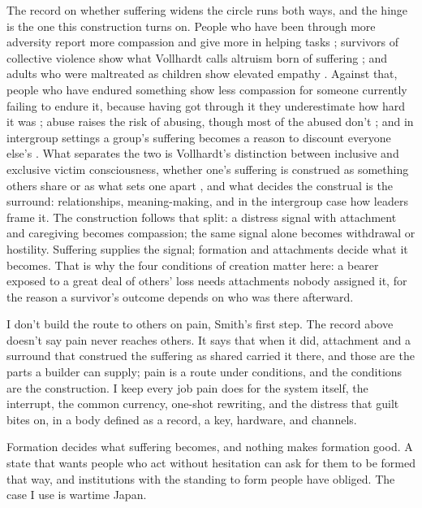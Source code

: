 The record on whether suffering widens the circle runs both ways, and the hinge is the one this construction turns on. People who have been through more adversity report more compassion and give more in helping tasks \autocite{lim2016suffering}; survivors of collective violence show what Vollhardt calls altruism born of suffering \autocite{vollhardt2009altruism}; and adults who were maltreated as children show elevated empathy \autocite{greenberg2018elevated}. Against that, people who have endured something show less compassion for someone currently failing to endure it, because having got through it they underestimate how hard it was \autocite{ruttan2015been}; abuse raises the risk of abusing, though most of the abused don't \autocite{widom1989cycle}; and in intergroup settings a group's suffering becomes a reason to discount everyone else's \autocite{noor2012competitive}. What separates the two is Vollhardt's distinction between inclusive and exclusive victim consciousness, whether one's suffering is construed as something others share or as what sets one apart \autocite{vollhardt2015inclusive}, and what decides the construal is the surround: relationships, meaning-making, and in the intergroup case how leaders frame it. The construction follows that split: a distress signal with attachment and caregiving becomes compassion; the same signal alone becomes withdrawal or hostility. Suffering supplies the signal; formation and attachments decide what it becomes. That is why the four conditions of creation matter here: a bearer exposed to a great deal of others' loss needs attachments nobody assigned it, for the reason a survivor's outcome depends on who was there afterward.

I don't build the route to others on pain, Smith's first step. The record above doesn't say pain never reaches others. It says that when it did, attachment and a surround that construed the suffering as shared carried it there, and those are the parts a builder can supply; pain is a route under conditions, and the conditions are the construction. I keep every job pain does for the system itself, the interrupt, the common currency, one-shot rewriting, and the distress that guilt bites on, in a body defined as a record, a key, hardware, and channels.


Formation decides what suffering becomes, and nothing makes formation good. A state that wants people who act without hesitation can ask for them to be formed that way, and institutions with the standing to form people have obliged. The case I use is wartime Japan.

